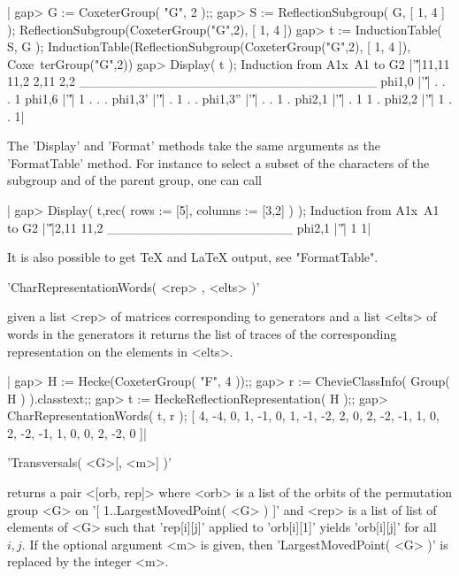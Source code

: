 |    gap> G := CoxeterGroup( "G", 2 );;
    gap> S := ReflectionSubgroup( G, [ 1, 4 ] );
    ReflectionSubgroup(CoxeterGroup("G",2), [ 1, 4 ])
    gap> t := InductionTable( S, G );
    InductionTable(ReflectionSubgroup(CoxeterGroup("G",2), [ 1, 4 ]), Coxe\
    terGroup("G",2))
    gap> Display( t );
    Induction from A1x~A1 to G2
               |'\|'|11,11 11,2 2,11 2,2
    ________________________________
    phi{1,0}   |'\|'|    .    .    .   1
    phi{1,6}   |'\|'|    1    .    .   .
    phi{1,3}'  |'\|'|    .    1    .   .
    phi{1,3}'' |'\|'|    .    .    1   .
    phi{2,1}   |'\|'|    .    1    1   .
    phi{2,2}   |'\|'|    1    .    .   1|

The  'Display'  and  'Format'  methods  take  the  same  arguments  as  the
'FormatTable'  method. For instance to select a subset of the characters of
the subgroup and of the parent group, one can call

|    gap> Display( t,rec( rows := [5], columns := [3,2] ) );
    Induction from A1x~A1 to G2
             |'\|'|2,11 11,2
    ____________________
    phi{2,1} |'\|'|   1    1|

It is also possible to get TeX and LaTeX output, see "FormatTable".

\Section{CharRepresentationWords}

'CharRepresentationWords( <rep> , <elts> )'

given  a list <rep>  of matrices  corresponding to generators  and a list
<elts>  of words in  the generators it returns  the list of traces of the
corresponding representation on the elements in <elts>.

|    gap> H := Hecke(CoxeterGroup( "F", 4 ));;
    gap> r := ChevieClassInfo( Group( H ) ).classtext;;
    gap> t := HeckeReflectionRepresentation( H );;
    gap> CharRepresentationWords( t, r );
    [ 4, -4, 0, 1, -1, 0, 1, -1, -2, 2, 0, 2, -2, -1, 1, 0, 2, -2, -1, 1,
      0, 0, 2, -2, 0 ]|

\Section{Transversals}%
%

'Transversals( <G>[, <m>] )'

returns a  pair <[orb, rep]> where  <orb> is a list of  the orbits of the
permutation group <G> on '[ 1..LargestMovedPoint( <G> ) ]' and <rep> is a
list  of   list of elements   of  <G>  such  that 'rep[i][j]'  applied to
'orb[i][1]'  yields 'orb[i][j]' for all $i,j$.  If  the optional argument
<m> is given, then 'LargestMovedPoint( <G> )' is  replaced by the integer
<m>.

